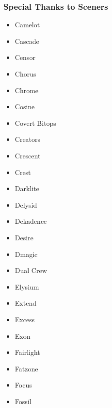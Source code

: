 
\begin{frame}[noframenumbering]
\frametitle{Special Thanks to Sceners}

\begin{multicols}{3}
\begin{itemize}
\item Camelot
\item Cascade
\item Censor
\item Chorus
\item Chrome
\item Cosine
\item Covert Bitops
\item Creators
\item Crescent
\item Crest
\item Darklite
\item Delysid
\item Dekadence
\item Desire
\item Dmagic
\item Dual Crew
\item Elysium
\item Extend
\item Excess
\item Exon
\item Fairlight
\item Fatzone
\item Focus
\item Fossil
\end{itemize}
\end{multicols}

\end{frame}


